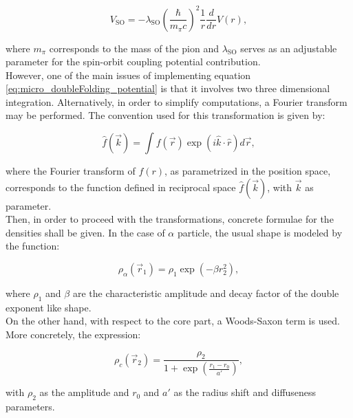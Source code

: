 \documentclass[openany]{book}
\begin{document}
\begin{equation}\label{eq:potential_M3Y_spinOrbit}
	V_{\mathrm{SO}} = 	- \lambda_{\mathrm{SO}} \left(\frac{\hbar}{m_\pi c}\right)^2 \frac{1}{r} \frac{d}{dr} V(r),
\end{equation}

where $m_\pi$ corresponds to the mass of the pion and $\lambda_{\mathrm{SO}}$ serves as an adjustable parameter for the spin-orbit coupling potential contribution. \\

However, one of the main issues of implementing equation \ref{eq:micro_doubleFolding_potential} is that it involves two three dimensional integration. Alternatively, in order to simplify computations, a Fourier transform may be performed. The convention used for this transformation is given by: 

\begin{equation}\label{eq:micro_doubleFolding_fourierTransform}
	\hat f(\vec k) = \int f(\vec r) \exp(i \hat k \cdot \hat r) d \vec r,
\end{equation}

where the Fourier transform of $f(r)$, as parametrized in the position space, corresponds to the function defined in reciprocal space $\hat f(\vec k)$, with $\vec k$ as parameter. \\

Then, in order to proceed with the transformations, concrete formulae for the densities shall be given. In the case of  $\alpha$ particle, the usual shape is modeled by the function:

\begin{equation}\label{eq:micro_doubleFolding_potential_rhoalpha}
	\rho_\alpha (\vec r_1) = \rho_1 \exp (-\beta r^2_2),
\end{equation}

where $\rho_1$ and $\beta$ are the characteristic amplitude and decay factor of the double exponent like shape. \\

On the other hand, with respect to the core part, a Woods-Saxon term is used. More concretely, the expression: 

\begin{equation}\label{eq:micro_doubleFolding_potential_rhoC}
	\rho_c(\vec r_2) =  \frac{\rho_2}{1 + \exp {\left(\frac{r_1 - r_0}{a'}\right)}},
\end{equation}

with $\rho_2$ as the amplitude and $r_0$ and $a'$ as the radius shift and diffuseness parameters. \\ 
\end{document}
